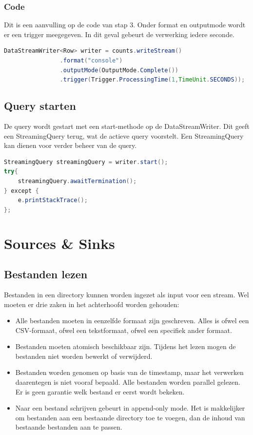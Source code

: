 \documentclass[a4paper,10pt,twoside]{report}
\begin{document}
\subsubsection{Code}

Dit is een aanvulling op de code van stap 3. Onder format en outputmode wordt er een trigger meegegeven. In dit geval gebeurt de verwerking iedere seconde. 

\begin{lstlisting}[language=Java]
DataStreamWriter<Row> writer = counts.writeStream()
				.format("console")
				.outputMode(OutputMode.Complete())
				.trigger(Trigger.ProcessingTime(1,TimeUnit.SECONDS));
\end{lstlisting}

\subsection{Query starten}

De query wordt gestart met een start-methode op de DataStreamWriter. Dit geeft een StreamingQuery terug, wat de actieve query voorstelt. Een StreamingQuery kan dienen voor verder beheer van de query.

\begin{lstlisting}[language=Java]
StreamingQuery streamingQuery = writer.start();
try{
	streamingQuery.awaitTermination();
} except {
	e.printStackTrace();
};
\end{lstlisting}

\section{Sources \& Sinks}

\subsection{Bestanden lezen}

Bestanden in een directory kunnen worden ingezet als input voor een stream. Wel moeten er drie zaken in het achterhoofd worden gehouden:

\begin{itemize}
	\item Alle bestanden moeten in eenzelfde formaat zijn geschreven. Alles is ofwel een CSV-formaat, ofwel een tekstformaat, ofwel een specifiek ander formaat.
	\item Bestanden moeten atomisch beschikbaar zijn. Tijdens het lezen mogen de bestanden niet worden bewerkt of verwijderd.
	\item Bestanden worden genomen op basis van de timestamp, maar het verwerken daarentegen is niet vooraf bepaald. Alle bestanden worden parallel gelezen. Er is geen garantie welk bestand er eerst wordt bekeken.
	\item Naar een bestand schrijven gebeurt in append-only mode. Het is makkelijker om bestanden aan een bestaande directory toe te voegen, dan de inhoud van bestaande bestanden aan te passen.
\end{itemize}
\end{document}
